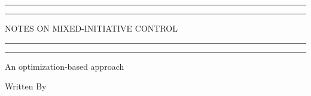 \documentclass{Base}
\begin{document}
\clearpage
\newcommand\nbvspace[1][3]{\vspace*{\stretch{#1}}}
\newcommand\nbstretchyspace{\spaceskip0.5em plus 0.25em minus 0.25em}
\newcommand{\nbtitlestretch}{\spaceskip0.6em}
\pagestyle{empty}
\begin{center}
\centering %
	
	\scshape %
	
	\vspace*{\baselineskip} %
	
	
	\rule{\textwidth}{1.6pt}\vspace*{-\baselineskip}\vspace*{2pt} %
	\rule{\textwidth}{0.4pt} %
	
	\vspace{0.75\baselineskip} %
	
	{\LARGE NOTES ON MIXED-INITIATIVE CONTROL\\} %
	
	\vspace{0.75\baselineskip} %
	
	\rule{\textwidth}{0.4pt}\vspace*{-\baselineskip}\vspace{3.2pt} %
	\rule{\textwidth}{1.6pt} %
	
	\vspace{2\baselineskip} %
	
	
	An optimization-based approach %
	
	\vspace*{3\baselineskip} %
	
	
	Written By
	

\end{center}
\end{document}
